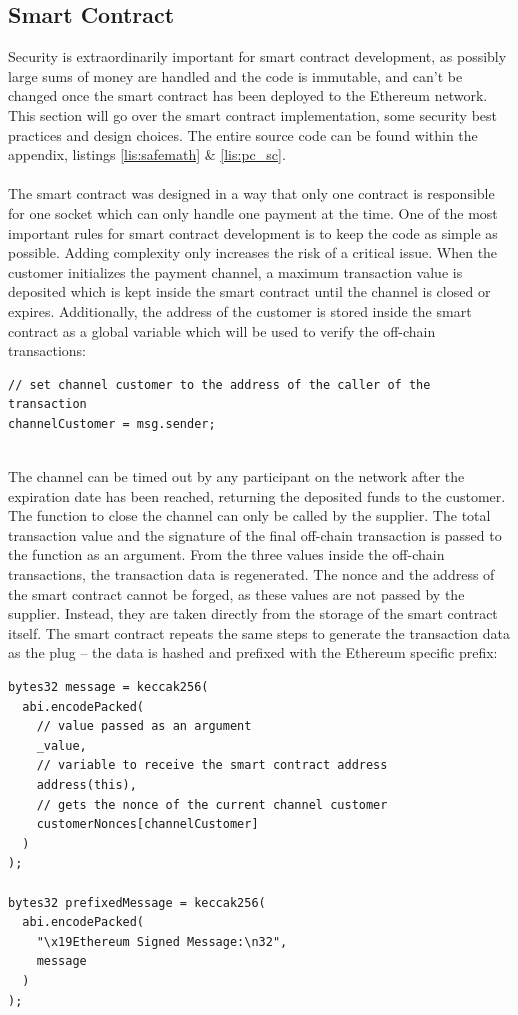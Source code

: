 \subsection{Smart Contract}
Security is extraordinarily important for smart contract development, as possibly large sums of money are handled and the code is immutable, and can’t be changed once the smart contract has been deployed to the Ethereum network.
This section will go over the smart contract implementation, some security best practices and design choices.
The entire source code can be found within the appendix, listings \ref{lis:safemath} \& \ref{lis:pc_sc}.
\\\\
The smart contract was designed in a way that only one contract is responsible for one socket which can only handle one payment at the time.
One of the most important rules for smart contract development is to keep the code as simple as possible.
Adding complexity only increases the risk of a critical issue.
When the customer initializes the payment channel, a maximum transaction value is deposited which is kept inside the smart contract until the channel is closed or expires.
Additionally, the address of the customer is stored inside the smart contract as a global variable which will be used to verify the off-chain transactions:
\begin{lstlisting}[language=Solidity, numbers=none]
// set channel customer to the address of the caller of the transaction
channelCustomer = msg.sender;
\end{lstlisting}
\leavevmode
\\
The channel can be timed out by any participant on the network after the expiration date has been reached, returning the deposited funds to the customer.
The function to close the channel can only be called by the supplier.
The total transaction value and the signature of the final off-chain transaction is passed to the function as an argument.
From the three values inside the off-chain transactions, the transaction data is regenerated.
The nonce and the address of the smart contract cannot be forged, as these values are not passed by the supplier.
Instead, they are taken directly from the storage of the smart contract itself.
The smart contract repeats the same steps to generate the transaction data as the plug – the data is hashed and prefixed with the Ethereum specific prefix:
\\
\begin{lstlisting}[language=Solidity, numbers=none]
bytes32 message = keccak256(
  abi.encodePacked(
    // value passed as an argument
    _value,
    // variable to receive the smart contract address
    address(this),
    // gets the nonce of the current channel customer
    customerNonces[channelCustomer]
  )
);

bytes32 prefixedMessage = keccak256(
  abi.encodePacked(
    "\x19Ethereum Signed Message:\n32",
    message
  )
);
\end{lstlisting}

